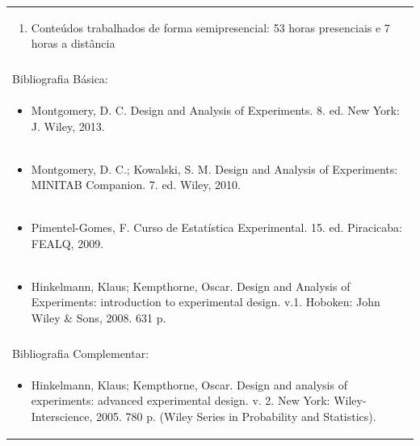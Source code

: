 \documentclass[11pt]{article}
\begin{document}
\begin{center}
\begin{longtable}{|p{4cm}|p{4cm}|p{4cm}|p{4cm}|}
\multicolumn{4}{|p{\dimexpr 16cm + 6\tabcolsep\relax}|}{\begin{enumerate}[start=9]\item Conteúdos trabalhados de forma semipresencial: 53 horas presenciais e 7 horas a distância\end{enumerate}}\\
\multicolumn{4}{|p{\dimexpr 16cm + 6\tabcolsep\relax}|}{}\\
\hline
\multicolumn{4}{|p{16cm}|}{Bibliografia Básica:}\\*
\multicolumn{4}{|p{\dimexpr 16cm + 6\tabcolsep\relax}|}{\begin{itemize}\item Montgomery, D. C. Design and Analysis of Experiments. 8. ed. New York: J. Wiley, 2013.\end{itemize}}\\
\multicolumn{4}{|p{\dimexpr 16cm + 6\tabcolsep\relax}|}{\begin{itemize}\item Montgomery, D. C.; Kowalski, S. M. Design and Analysis of Experiments: MINITAB Companion. 7. ed. Wiley, 2010.\end{itemize}}\\
\multicolumn{4}{|p{\dimexpr 16cm + 6\tabcolsep\relax}|}{\begin{itemize}\item Pimentel-Gomes, F. Curso de Estatística Experimental. 15. ed. Piracicaba: FEALQ, 2009.\end{itemize}}\\
\multicolumn{4}{|p{\dimexpr 16cm + 6\tabcolsep\relax}|}{\begin{itemize}\item Hinkelmann, Klaus; Kempthorne, Oscar. Design and Analysis of Experiments: introduction to experimental design. v.1. Hoboken: John Wiley \& Sons, 2008. 631 p.\end{itemize}}\\
\multicolumn{4}{|p{16cm}|}{}\\
\hline
\multicolumn{4}{|p{16cm}|}{Bibliografia Complementar:}\\*
\multicolumn{4}{|p{\dimexpr 16cm + 6\tabcolsep\relax}|}{\begin{itemize}\item Hinkelmann, Klaus; Kempthorne, Oscar. Design and analysis of experiments: advanced experimental design. v. 2. New York: Wiley-Interscience, 2005. 780 p. (Wiley Series in Probability and Statistics).\end{itemize}}\\

\end{longtable}
\end{center}
\end{document}
